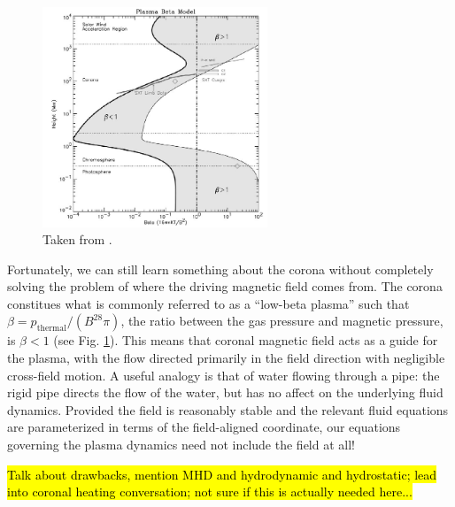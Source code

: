 %
\begin{figure}
	\centering
	\includegraphics[width=0.6\textwidth]{figures/plasma_beta.png}
	\caption{Taken from \citet{gary_plasma_2001}.}
	\label{fig:plasma_beta}
\end{figure}
%
\par Fortunately, we can still learn something about the corona without completely solving the problem of where the driving magnetic field comes from. The corona constitues what is commonly referred to as a ``low-beta plasma'' such that $\beta=p_{\mathrm{thermal}}/(B^28\pi)$, the ratio between the gas pressure and magnetic pressure, is $\beta<1$ (see Fig. \ref{fig:plasma_beta}). This means that coronal magnetic field acts as a guide for the plasma, with the flow directed primarily in the field direction with negligible cross-field motion. A useful analogy is that of water flowing through a pipe: the rigid pipe directs the flow of the water, but has no affect on the underlying fluid dynamics. Provided the field is reasonably stable and the relevant fluid equations are parameterized in terms of the field-aligned coordinate, our equations governing the plasma dynamics need not include the field at all!
%
\par \hl{Talk about drawbacks, mention MHD and hydrodynamic and hydrostatic; lead into coronal heating conversation; not sure if this is actually needed here...}
